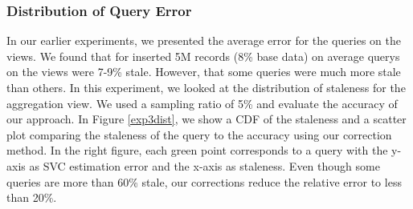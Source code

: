 \subsubsection{Distribution of Query Error} In our earlier experiments, we presented the average error for the queries on the views.
We found that for inserted 5M records (8\% base data) on average querys on the views were 7-9\% stale. 
However, that some queries were much more stale than others.
In this experiment, we looked at the distribution of staleness for the aggregation view.
We used a sampling ratio of 5\% and evaluate the accuracy of our approach. 
In Figure \ref{exp3dist}, we show a CDF of the staleness and a scatter plot comparing the staleness of the query to the accuracy using our correction method.
In the right figure, each green point corresponds to a query with the y-axis as SVC estimation error and the x-axis as staleness. 
Even though some queries are more than 60\% stale, our corrections reduce the relative error to less than 20\%.

